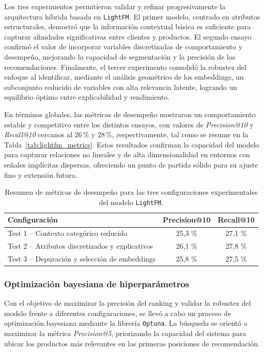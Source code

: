 Los tres experimentos permitieron validar y refinar progresivamente la arquitectura híbrida basada en \texttt{LightFM}. El primer modelo, centrado en atributos estructurales, demostró que la información contextual básica es suficiente para capturar afinidades significativas entre clientes y productos. El segundo ensayo confirmó el valor de incorporar variables discretizadas de comportamiento y desempeño, mejorando la capacidad de segmentación y la precisión de las recomendaciones. Finalmente, el tercer experimento consolidó la robustez del enfoque al identificar, mediante el análisis geométrico de los embeddings, un subconjunto reducido de variables con alta relevancia latente, logrando un equilibrio óptimo entre explicabilidad y rendimiento.

En términos globales, las métricas de desempeño mostraron un comportamiento estable y competitivo entre los distintos ensayos, con valores de \textit{Precision@10} y \textit{Recall@10} cercanos al 26\,\% y 28\,\%, respectivamente, tal como se resume en la Tabla~\ref{tab:lightfm_metrics}. Estos resultados confirman la capacidad del modelo para capturar relaciones no lineales y de alta dimensionalidad en entornos con señales implícitas dispersas, ofreciendo un punto de partida sólido para su ajuste fino y extensión futura.

\begin{table}[h]
	\centering
	\caption[Resultados comparativos de los ensayos con LightFM]{Resumen de métricas de desempeño para las tres configuraciones experimentales del modelo \texttt{LightFM}.}
	\begin{tabular}{l c c}    
		\toprule
		\textbf{Configuración} & \textbf{Precision@10} & \textbf{Recall@10} \\
		\midrule
		Test 1 – Contexto categórico reducido & 25{,}3 \% & 27{,}1 \% \\
		Test 2 – Atributos discretizados y explicativos & 26{,}1 \% & 27{,}8 \% \\
		Test 3 – Depuración y selección de embeddings & 25{,}8 \% & 27{,}5 \% \\
		\bottomrule
	\end{tabular}
	\label{tab:resultados_lightfm}
\end{table}

\subsubsection{Optimización bayesiana de hiperparámetros}

Con el objetivo de maximizar la precisión del ranking y validar la robustez del modelo frente a diferentes configuraciones, se llevó a cabo un proceso de optimización bayesiana mediante la librería \texttt{Optuna}. La búsqueda se orientó a maximizar la métrica \textit{Precision@5}, priorizando la capacidad del sistema para ubicar los productos más relevantes en las primeras posiciones de recomendación.

